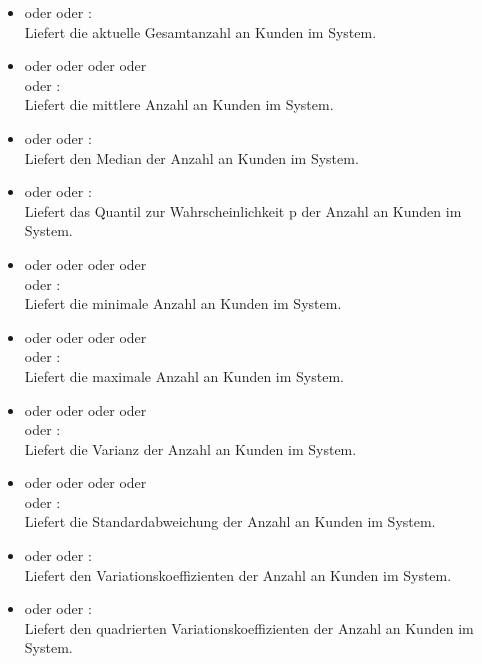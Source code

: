 \begin{itemize}

\item
{} oder  oder :\\
Liefert die aktuelle Gesamtanzahl an Kunden im System.

\item
{} oder  oder  oder  oder\\
 oder :\\
Liefert die mittlere Anzahl an Kunden im System.

\item
{} oder  oder :\\	
Liefert den Median der Anzahl an Kunden im System.

\item
{} oder  oder :\\
Liefert das Quantil zur Wahrscheinlichkeit p der Anzahl an Kunden im System.

\item
{} oder  oder  oder  oder\\
 oder :\\
Liefert die minimale Anzahl an Kunden im System.

\item
{} oder  oder  oder  oder\\
 oder :\\
Liefert die maximale Anzahl an Kunden im System.

\item
{} oder  oder  oder  oder\\
 oder :\\
Liefert die Varianz der Anzahl an Kunden im System.

\item
{} oder  oder  oder  oder\\
 oder :\\
Liefert die Standardabweichung der Anzahl an Kunden im System.

\item
{} oder  oder :\\
Liefert den Variationskoeffizienten der Anzahl an Kunden im System.

\item
{} oder  oder :\\
Liefert den quadrierten Variationskoeffizienten der Anzahl an Kunden im System.

\end{itemize}
